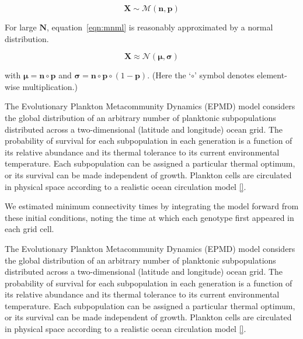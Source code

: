 \documentclass[12pt]{article}
\begin{document}
\begin{equation}
\label{eqn:mnml}
\mathbf{X}\sim\mathcal{M}(\mathbf{n},\mathbf{p})
\end{equation}

For large $\mathbf{N}$, equation~\ref{eqn:mnml} is reasonably approximated by a normal distribution.

\begin{equation}
\mathbf{X}\approx\mathcal{N}(\boldsymbol{\mu},\boldsymbol{\sigma})
\end{equation}

with $\boldsymbol{\mu}=\mathbf{n}\circ\mathbf{p}$ and $\boldsymbol{\sigma}=\mathbf{n}\circ\mathbf{p}\circ(1-\mathbf{p})$. (Here the `$\circ$' symbol denotes element-wise multiplication.)




The Evolutionary Plankton Metacommunity Dynamics (EPMD) model considers the global distribution of an arbitrary number of planktonic subpopulations distributed across a two-dimensional (latitude and longitude) ocean grid. The probability of survival for each subpopulation in each generation is a function of its relative abundance and its thermal tolerance to its current environmental temperature. Each subpopulation can be assigned a particular thermal optimum, or its survival can be made independent of growth. Plankton cells are circulated in physical space according to a realistic ocean circulation model \ref{}. 



We estimated minimum connectivity times by integrating the model forward from these initial conditions, noting the time at which each genotype first appeared in each grid cell. 

The Evolutionary Plankton Metacommunity Dynamics (EPMD) model considers the global distribution of an arbitrary number of  planktonic subpopulations distributed across a two-dimensional (latitude and longitude) ocean grid. The probability of survival for each subpopulation in each generation is a function of its relative abundance and its thermal tolerance to its current environmental temperature. Each subpopulation can be assigned a particular thermal optimum, or its survival can be made independent of growth. Plankton cells are circulated in physical space according to a realistic ocean circulation model \ref{}. 
\end{document}
